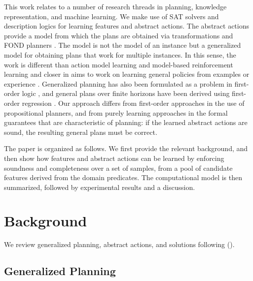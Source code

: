 \documentclass[letterpaper]{article} %
\newcommand{\citeay}[1]{\citeauthor{#1} (\citeyear{#1})}
\begin{document}
This work relates to a number of research threads in planning, knowledge
representation, and machine learning. We make use of SAT solvers and description
logics for learning features and abstract actions. %
The abstract actions provide a model from which the plans are obtained via
transformations and FOND planners \cite{geffner:book,ghallab:book}.
The model is not the model of an instance but a generalized model for obtaining
plans that work for multiple instances. In this sense, the work is different than
action model learning \cite{yang:action-learning} and model-based reinforcement
learning and closer in aims to work on learning general policies from examples or
experience \cite{martin-geffner:generalized,fern:bias,mazebase,general-drl}.
Generalized planning has also been formulated as a problem in first-order logic
\cite{srivastava:generalized}, and general plans over finite horizons have been
derived using first-order regression \cite{boutilier2001symbolic,wang2008first,van2012solving,sanner:practicalMDPs}.
Our approach differs from first-order approaches in the use of propositional
planners, and from purely learning approaches in the formal guarantees that
are characteristic of planning: if the learned abstract actions are  sound,
the resulting general plans must be correct.

The paper is organized as follows. We first provide the relevant background, and then show
how features and abstract actions can be learned by enforcing soundness and
completeness over a set of samples, from a pool of candidate features derived
from the domain predicates. The computational model is then summarized,
followed by experimental results and a discussion.


\section{Background}

We review generalized planning, abstract actions, and solutions following  \citeay{bonet:ijcai2018}.


\subsection{Generalized Planning}
\end{document}
